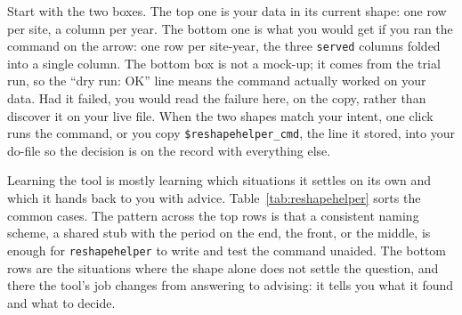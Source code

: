 Start with the two boxes. The top one is your data in its current shape: one row per site, a column per year. The bottom one is what you would get if you ran the command on the arrow: one row per site-year, the three \texttt{served} columns folded into a single column. The bottom box is not a mock-up; it comes from the trial run, so the \enquote{dry run: OK} line means the command actually worked on your data. Had it failed, you would read the failure here, on the copy, rather than discover it on your live file. When the two shapes match your intent, one click runs the command, or you copy \texttt{\$reshapehelper\_cmd}, the line it stored, into your do-file so the decision is on the record with everything else.

Learning the tool is mostly learning which situations it settles on its own and which it hands back to you with advice. Table~\ref{tab:reshapehelper} sorts the common cases. The pattern across the top rows is that a consistent naming scheme, a shared stub with the period on the end, the front, or the middle, is enough for \texttt{reshapehelper} to write and test the command unaided. The bottom rows are the situations where the shape alone does not settle the question, and there the tool's job changes from answering to advising: it tells you what it found and what to decide.

